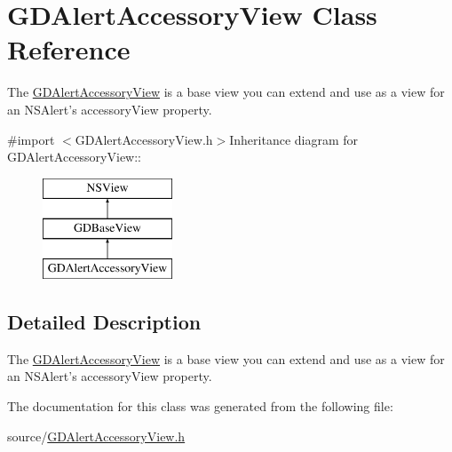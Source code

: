 \hypertarget{interface_g_d_alert_accessory_view}{
\section{GDAlertAccessoryView Class Reference}
\label{interface_g_d_alert_accessory_view}
}


The \hyperlink{interface_g_d_alert_accessory_view}{GDAlertAccessoryView} is a base view you can extend and use as a view for an NSAlert's accessoryView property.  


{\ttfamily \#import $<$GDAlertAccessoryView.h$>$}Inheritance diagram for GDAlertAccessoryView::\begin{figure}[H]
\begin{center}
\leavevmode
\includegraphics[height=3cm]{interface_g_d_alert_accessory_view}
\end{center}
\end{figure}


\subsection{Detailed Description}
The \hyperlink{interface_g_d_alert_accessory_view}{GDAlertAccessoryView} is a base view you can extend and use as a view for an NSAlert's accessoryView property. 

The documentation for this class was generated from the following file:\begin{DoxyCompactItemize}
\item 
source/\hyperlink{_g_d_alert_accessory_view_8h}{GDAlertAccessoryView.h}\end{DoxyCompactItemize}
